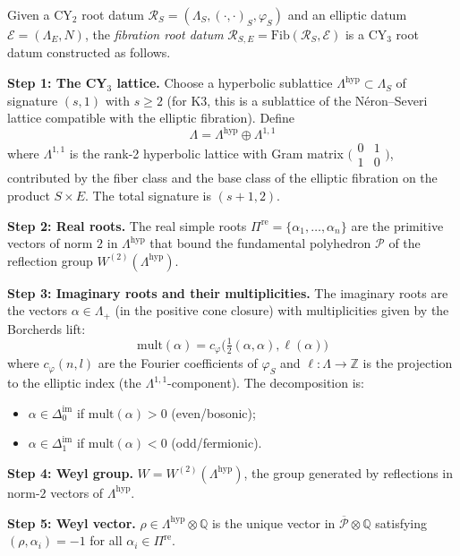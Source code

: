 \begin{construction}
\label{constr:fibration}
Given a CY$_2$ root datum $\mathcal{R}_S = (\Lambda_S, (\cdot,\cdot)_S, \varphi_S)$ and an elliptic datum $\mathcal{E} = (\Lambda_E, N)$, the \emph{fibration root datum} $\mathcal{R}_{S,E} = \mathrm{Fib}(\mathcal{R}_S, \mathcal{E})$ is a CY$_3$ root datum constructed as follows.

\medskip\noindent
\textbf{Step 1: The CY$_3$ lattice.} Choose a hyperbolic sublattice $\Lambda^{\mathrm{hyp}} \subset \Lambda_S$ of signature $(s, 1)$ with $s \geq 2$ (for K3, this is a sublattice of the N\'eron--Severi lattice compatible with the elliptic fibration). Define
\[
 \Lambda = \Lambda^{\mathrm{hyp}} \oplus \Lambda^{1,1}
\]
where $\Lambda^{1,1}$ is the rank-2 hyperbolic lattice with Gram matrix $\bigl(\begin{smallmatrix} 0 & 1 \\ 1 & 0 \end{smallmatrix}\bigr)$, contributed by the fiber class and the base class of the elliptic fibration on the product $S \times E$. The total signature is $(s+1, 2)$.

\medskip\noindent
\textbf{Step 2: Real roots.} The real simple roots $\Pi^{\mathrm{re}} = \{\alpha_1, \ldots, \alpha_n\}$ are the primitive vectors of norm $2$ in $\Lambda^{\mathrm{hyp}}$ that bound the fundamental polyhedron $\mathcal{P}$ of the reflection group $W^{(2)}(\Lambda^{\mathrm{hyp}})$.

\medskip\noindent
\textbf{Step 3: Imaginary roots and their multiplicities.} The imaginary roots are the vectors $\alpha \in \Lambda_+$ (in the positive cone closure) with multiplicities given by the Borcherds lift:
\[
 \mathrm{mult}(\alpha) = c_\varphi\bigl(\tfrac{1}{2}(\alpha, \alpha), \ell(\alpha)\bigr)
\]
where $c_\varphi(n, l)$ are the Fourier coefficients of $\varphi_S$ and $\ell \colon \Lambda \to \mathbb{Z}$ is the projection to the elliptic index (the $\Lambda^{1,1}$-component). The decomposition is:
\begin{itemize}
 \item $\alpha \in \Delta^{\mathrm{im}}_0$ if $\mathrm{mult}(\alpha) > 0$ (even/bosonic);
 \item $\alpha \in \Delta^{\mathrm{im}}_1$ if $\mathrm{mult}(\alpha) < 0$ (odd/fermionic).
\end{itemize}

\medskip\noindent
\textbf{Step 4: Weyl group.} $W = W^{(2)}(\Lambda^{\mathrm{hyp}})$, the group generated by reflections in norm-$2$ vectors of $\Lambda^{\mathrm{hyp}}$.

\medskip\noindent
\textbf{Step 5: Weyl vector.} $\rho \in \Lambda^{\mathrm{hyp}} \otimes \mathbb{Q}$ is the unique vector in $\overline{\mathcal{P}} \otimes \mathbb{Q}$ satisfying $(\rho, \alpha_i) = -1$ for all $\alpha_i \in \Pi^{\mathrm{re}}$.
\end{construction}

